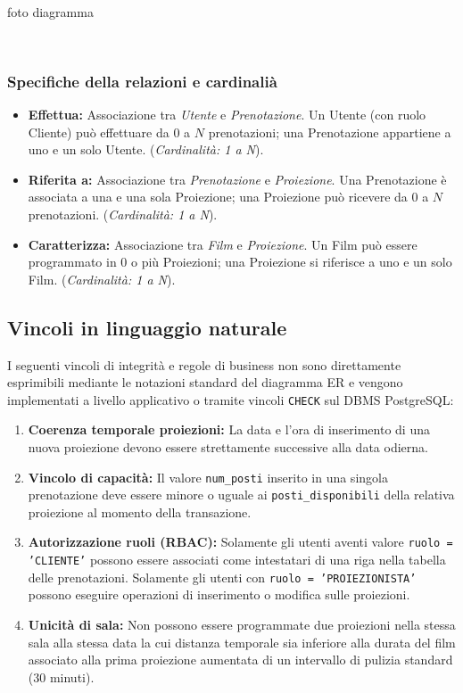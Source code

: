 \documentclass{article}
\begin{document}
\\


foto diagramma 

\\



\subsubsection{Specifiche della relazioni e cardinalià}
\begin{itemize}
    \item \textbf{Effettua:} Associazione tra \textit{Utente} e \textit{Prenotazione}. Un Utente (con ruolo Cliente) può effettuare da $0$ a $N$ prenotazioni; una Prenotazione appartiene a uno e un solo Utente. (\textit{Cardinalità: 1 a N}).
    \item \textbf{Riferita a:} Associazione tra \textit{Prenotazione} e \textit{Proiezione}. Una Prenotazione è associata a una e una sola Proiezione; una Proiezione può ricevere da $0$ a $N$ prenotazioni. (\textit{Cardinalità: 1 a N}).
    \item \textbf{Caratterizza:} Associazione tra \textit{Film} e \textit{Proiezione}. Un Film può essere programmato in $0$ o più Proiezioni; una Proiezione si riferisce a uno e un solo Film. (\textit{Cardinalità: 1 a N}).
\end{itemize}

\subsection{Vincoli in linguaggio naturale}
I seguenti vincoli di integrità e regole di business non sono direttamente esprimibili mediante le notazioni standard del diagramma ER e vengono implementati a livello applicativo o tramite vincoli \texttt{CHECK} sul DBMS PostgreSQL:
\begin{enumerate}
    \item \textbf{Coerenza temporale proiezioni:} La data e l'ora di inserimento di una nuova proiezione devono essere strettamente successive alla data odierna.
    \item \textbf{Vincolo di capacità:} Il valore \texttt{num\_posti} inserito in una singola prenotazione deve essere minore o uguale ai \texttt{posti\_disponibili} della relativa proiezione al momento della transazione.
    \item \textbf{Autorizzazione ruoli (RBAC):} Solamente gli utenti aventi valore \texttt{ruolo = 'CLIENTE'} possono essere associati come intestatari di una riga nella tabella delle prenotazioni. Solamente gli utenti con \texttt{ruolo = 'PROIEZIONISTA'} possono eseguire operazioni di inserimento o modifica sulle proiezioni.
    \item \textbf{Unicità di sala:} Non possono essere programmate due proiezioni nella stessa sala alla stessa data la cui distanza temporale sia inferiore alla durata del film associato alla prima proiezione aumentata di un intervallo di pulizia standard (30 minuti).
\end{enumerate}
\end{document}
